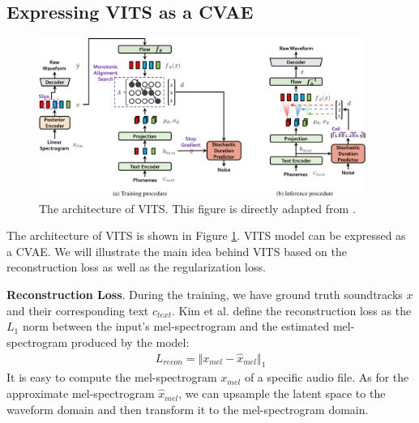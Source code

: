 \documentclass{article}
\begin{document}
\subsection{Expressing VITS as a CVAE}
\begin{figure}[!ht]
    \begin{center}
        \includegraphics[width=0.95\textwidth]{vits.png}
    \end{center}
    \caption{The architecture of VITS. This figure is directly adapted from \cite{2021kim}.}
    \label{fig:method-vits}
\end{figure}

The architecture of VITS is shown in Figure \ref{fig:method-vits}. VITS model can be expressed as a CVAE. We will illustrate the main idea behind VITS based on the reconstruction loss as well as the regularization loss.

\textbf{Reconstruction Loss}. During the training, we have ground truth soundtracks $x$ and their corresponding text $c_{text}$. Kim et al. \cite{2021kim} define the reconstruction loss as the $L_1$ norm between the input's mel-spectrogram and the estimated mel-spectrogram produced by the model:
\begin{align}
    L_{recon} = \Vert x_{mel} - \hat{x}_{mel} \Vert_1
\end{align}
It is easy to compute the mel-spectrogram $x_{mel}$ of a specific audio file. As for the approximate mel-spectrogram $\hat{x}_{mel}$, we can upsample the latent space to the waveform domain and then transform it to the mel-spectrogram domain.
\end{document}

